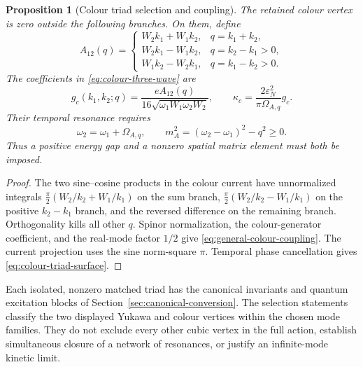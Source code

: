 \documentclass[11pt,a4paper,oneside]{book}
\theoremstyle{plain}
\newtheorem{proposition}[theorem]{Proposition}
\theoremstyle{definition}
\theoremstyle{remark}
\newcommand{\src}[2]{\cite{#1}}
\begin{document}
\begin{proposition}[Colour triad selection and coupling]
\label{prop:general-colour-triad}
The retained colour vertex is zero outside the following branches.  On
them, define
\begin{equation}
 A_{12}(q)=\begin{cases}
 W_2k_1+W_1k_2,&q=k_1+k_2,\\
 W_2k_1-W_1k_2,&q=k_2-k_1>0,\\
 W_1k_2-W_2k_1,&q=k_1-k_2>0.
 \end{cases}
 \label{eq:colour-selection-numerator}
\end{equation}
The coefficients in \eqref{eq:colour-three-wave} are
\begin{equation}
 g_c(k_1,k_2;q)=\frac{eA_{12}(q)}
                         {16\sqrt{\omega_1W_1\omega_2W_2}},
 \qquad
 \kappa_c=\frac{2\varepsilon_N^2}{\pi\Omega_{A,q}}g_c.
 \label{eq:general-colour-coupling}
\end{equation}
Their temporal resonance requires
\begin{equation}
 \omega_2=\omega_1+\Omega_{A,q},\qquad
 m_A^2=(\omega_2-\omega_1)^2-q^2\ge0.
 \label{eq:colour-triad-surface}
\end{equation}
Thus a positive energy gap and a nonzero spatial matrix element must both
be imposed.
\end{proposition}
\begin{proof}
The two sine--cosine products in the colour current have unnormalized
integrals $\tfrac\pi2(W_2/k_2+W_1/k_1)$ on the sum branch,
$\tfrac\pi2(W_2/k_2-W_1/k_1)$ on the positive $k_2-k_1$ branch, and
the reversed difference on the remaining branch.  Orthogonality kills
all other $q$.  Spinor normalization, the colour-generator coefficient,
and the real-mode factor $1/2$ give
\eqref{eq:general-colour-coupling}.  The current projection uses the sine
norm-square $\pi$.  Temporal phase cancellation gives
\eqref{eq:colour-triad-surface}.
\end{proof}
\src{R20}{thm:v20v32-modes,thm:v20v32-coupling}

Each isolated, nonzero matched triad has the canonical invariants and
quantum excitation blocks of Section~\ref{sec:canonical-conversion}.
The selection statements classify the two displayed Yukawa and colour
vertices within the chosen mode families.  They do not exclude every
other cubic vertex in the full action, establish simultaneous closure
of a network of resonances, or justify an infinite-mode kinetic limit.
\end{document}
